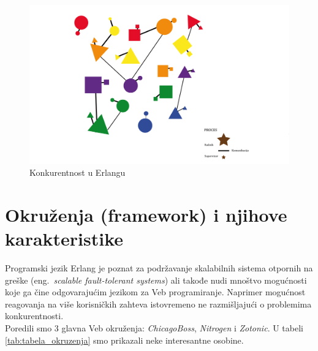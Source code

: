 \documentclass[a4paper]{article}
\begin{document}
{\begin{figure}[h!]
\begin{center}
\includegraphics[scale=0.5]{actor_model.png}
\end{center}
\caption{Konkurentnost u Erlangu}
\label{fig:actor_model}
\end{figure}

\section{Okruženja (framework) i njihove karakteristike}
\label{sec:okruzenja}
Programski jezik Erlang je poznat za podržavanje skalabilnih sistema otpornih na greške (eng.~{\em scalable fault-tolerant systems}) ali takođe nudi mnoštvo mogućnosti koje ga čine odgovarajućim jezikom za Veb programiranje. Naprimer mogućnost reagovanja na više korisničkih zahteva istovremeno ne razmišljajući o problemima konkurentnosti.\\

Poredili smo 3 glavna Veb okruženja: {\em ChicagoBoss}, {\em Nitrogen} i {\em Zotonic}. U tabeli \ref{tab:tabela_okruzenja} smo prikazali neke interesantne osobine.\\

}
\end{document}
